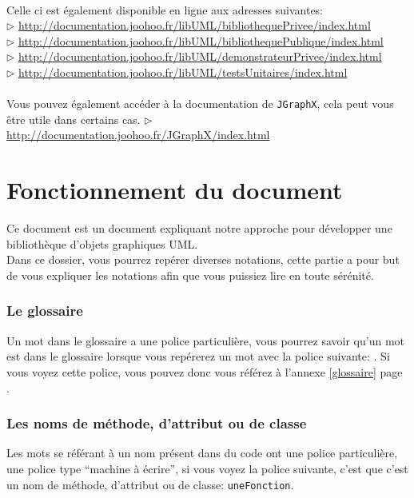	\paragraph{}
	Celle ci est également disponible en ligne aux adresses suivantes: \\
	$\rhd$ \url{http://documentation.joohoo.fr/libUML/bibliothequePrivee/index.html}\\
	$\rhd$ \url{http://documentation.joohoo.fr/libUML/bibliothequePublique/index.html}\\
	$\rhd$ \url{http://documentation.joohoo.fr/libUML/demonstrateurPrivee/index.html}\\\label{docDemonstrateur}
	$\rhd$ \url{http://documentation.joohoo.fr/libUML/testsUnitaires/index.html}\\
	\paragraph{}
	Vous pouvez également accéder à la documentation de \texttt{JGraphX}, cela peut vous être utile dans certains cas.
	$\rhd$ \url{http://documentation.joohoo.fr/JGraphX/index.html}\\

	\newpage
\section*{Fonctionnement du document}
Ce document est un document expliquant notre approche pour développer une bibliothèque d'objets graphiques UML.\\

Dans ce dossier, vous pourrez repérer diverses notations, cette partie a pour but de vous expliquer les notations afin
que vous puissiez lire en toute sérénité.
\subsubsection*{Le glossaire}
Un mot dans le glossaire a une police particulière, vous pourrez savoir qu'un mot est dans le glossaire lorsque vous repérerez un mot avec la police suivante: 
. Si vous voyez cette police, vous pouvez donc vous référez à l'annexe \ref{glossaire} page \pageref{glossaire}.
\subsubsection*{Les noms de méthode, d'attribut ou de classe}
Les mots se référant à un nom présent dans du code ont une police particulière, une police type ``machine à écrire'', si vous voyez la police suivante, c'est que c'est un nom 
de méthode, d'attribut ou de classe: \texttt{uneFonction}.

